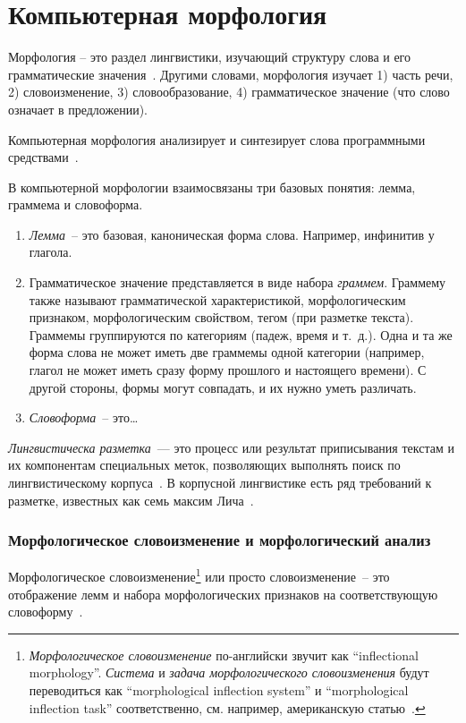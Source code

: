 \section{Компьютерная морфология}\label{sect_review_comp_morphology}

Морфология -- это раздел лингвистики, изучающий структуру слова и его грамматические значения~\cite{MitreninaNikolaevLando2016}. Другими словами, морфология изучает
1) часть речи,
2) словоизменение,
3) словообразование,
4) грамматическое значение (что слово означает в предложении).

Компьютерная морфология анализирует и синтезирует слова программными средствами~\cite{MitreninaNikolaevLando2016}.

В компьютерной морфологии взаимосвязаны три базовых понятия: лемма, граммема и словоформа.
\begin{enumerate}
    \item \emph{Лемма}~-- это базовая, каноническая форма слова.
        Например, инфинитив у глагола.

    \item Грамматическое значение представляется в виде набора \emph{граммем}.
        Граммему также называют грамматической характеристикой,
          морфологическим признаком, морфологическим свойством,
          тегом (при разметке текста).
        Граммемы группируются по категориям (падеж, время и т.~д.).
        Одна и та же форма слова не может иметь две граммемы одной категории
        (например, глагол не может иметь сразу форму прошлого и настоящего времени).
        С другой стороны, формы могут совпадать, и их нужно уметь различать.

    \item \emph{Словоформа}~-- это\ldots {}
\end{enumerate}

\emph{Лингвистическа разметка}~--- это процесс или результат 
приписывания текстам и их компонентам специальных меток, 
позволяющих выполнять поиск по лингвистическому корпуса~\cite[415]{Kibrik2019}.
%
В корпусной лингвистике есть ряд требований к разметке, известных как 
семь максим Лича~\cite[415--416]{Kibrik2019}. 


\subsubsection{Морфологическое словоизменение и морфологический анализ}

Морфологическое словоизменение\footnote{%
    \emph{Морфологическое словоизменение} по-английски звучит как
    ``inflectional morphology''.
    \emph{Система} и \emph{задача морфологического словоизменения}
    будут переводиться как
    ``morphological inflection system'' и ``morphological inflection task'' соответственно,
    см. например, американскую статью~\cite{King2020seq2seqRussianMA}.
} или просто словоизменение~--
это отображение лемм и набора морфологических признаков
на соответствующую словоформу~\cite[2821]{Cruz-Anastasopoulos-Stump2020Chatino}.

